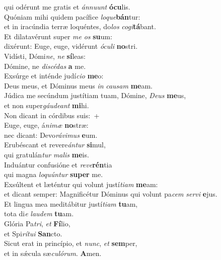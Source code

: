 \evenverse qui odérunt me gratis et \textit{án}\textit{nu}\textit{unt} \textbf{ó}\textbf{cu}lis.\\
\oddverse Quóniam mihi quidem pacífice \textit{lo}\textit{que}\textbf{bán}tur:~\*\\
\oddverse et in iracúndia terræ loquéntes, do\textit{los} \textit{co}\textit{gi}\textbf{tá}bant.\\
\evenverse Et dilatavérunt super \textit{me} \textit{os} \textbf{su}um:~\*\\
\evenverse dixérunt: Euge, euge, vidérunt \textit{ó}\textit{cu}\textit{li} \textbf{no}stri.\\
\oddverse Vidísti, Dómi\textit{ne}, \textit{ne} \textbf{sí}leas:~\*\\
\oddverse Dómine, ne \textit{di}\textit{scé}\textit{das} \textbf{a} me.\\
\evenverse Exsúrge et inténde judí\textit{ci}\textit{o} \textbf{me}o:~\*\\
\evenverse Deus meus, et Dóminus meus \textit{in} \textit{cau}\textit{sam} \textbf{me}am.\\
\oddverse Júdica me secúndum justítiam tuam, Dómine, \textit{De}\textit{us} \textbf{me}us,~\*\\
\oddverse et non super\textit{gáu}\textit{de}\textit{ant} \textbf{mi}hi.\\
\evenverse Non dicant in córdibus suis:~+\\
\evenverse  Euge, euge, á\textit{ni}\textit{mæ} \textbf{no}stræ:~\*\\
\evenverse nec dicant: Devo\textit{rá}\textit{vi}\textit{mus} \textbf{e}um.\\
\oddverse Erubéscant et revere\textit{án}\textit{tur} \textbf{si}mul,~\*\\
\oddverse qui gratulán\textit{tur} \textit{ma}\textit{lis} \textbf{me}is.\\
\evenverse Induántur confusióne et \textit{re}\textit{ve}\textbf{rén}tia~\*\\
\evenverse qui magna \textit{lo}\textit{quún}\textit{tur} \textbf{su}\textbf{per} me.\\
\oddverse Exsúltent et læténtur qui volunt justí\textit{ti}\textit{am} \textbf{me}am:~\*\\
\oddverse et dicant semper: Magnificétur Dóminus qui volunt pa\textit{cem} \textit{ser}\textit{vi} \textbf{e}jus.\\
\evenverse Et lingua mea meditábitur justí\textit{ti}\textit{am} \textbf{tu}am,~\*\\
\evenverse tota di\textit{e} \textit{lau}\textit{dem} \textbf{tu}am.\\
\oddverse Glória Pa\textit{tri}, \textit{et} \textbf{Fí}lio,~\*\\
\oddverse et Spi\textit{rí}\textit{tu}\textit{i} \textbf{San}cto.\\
\evenverse Sicut erat in princípio, et \textit{nunc}, \textit{et} \textbf{sem}per,~\*\\
\evenverse et in sǽcula sæ\textit{cu}\textit{ló}\textit{rum}. \textbf{A}men.\\
